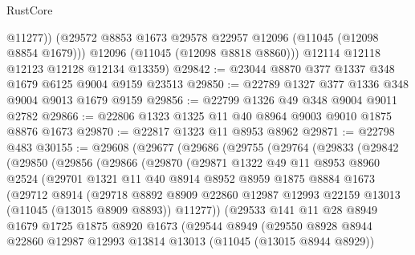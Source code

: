 \begin{lexlean}{RustCore}
\begin{coremodule}
            @11277))
        (@29572 @8853 @1673 @29578 @22957 @12096 (@11045 (@12098 @8854 @1679)))
        @12096
        (@11045 (@12098 @8818 @8860)))
      @12114
      @12118
      @12123
      @12128
      @12134
      @13359)
@29842 := @23044 @8870 @377 @1337 @348 @1679 @6125 @9004 @9159 @23513
@29850 := @22789 @1327 @377 @1336 @348 @9004 @9013 @1679 @9159
@29856 := @22799 @1326 @49 @348 @9004 @9011 @2782
@29866 := @22806 @1323 @1325 @11 @40 @8964 @9003 @9010 @1875 @8876 @1673
@29870 := @22817 @1323 @11 @8953 @8962
@29871 := @22798 @483
@30155 := @29608
    (@29677
      (@29686
        (@29755
          (@29764
            (@29833
              (@29842
                (@29850
                  (@29856
                    (@29866
                      (@29870
                        (@29871
                          @1322
                          @49
                          @11
                          @8953
                          @8960
                          @2524
                          (@29701
                            @1321
                            @11
                            @40
                            @8914
                            @8952
                            @8959
                            @1875
                            @8884
                            @1673
                            (@29712
                              @8914
                              (@29718
                                @8892
                                @8909
                                @22860
                                @12987
                                @12993
                                @22159
                                @13013
                                (@11045 (@13015 @8909 @8893))
                                @11277))
                            (@29533
                              @141
                              @11
                              @28
                              @8949
                              @1679
                              @1725
                              @1875
                              @8920
                              @1673
                              (@29544
                                @8949
                                (@29550
                                  @8928
                                  @8944
                                  @22860
                                  @12987
                                  @12993
                                  @13814
                                  @13013
                                  (@11045 (@13015 @8944 @8929))

\end{coremodule}
\end{lexlean}
